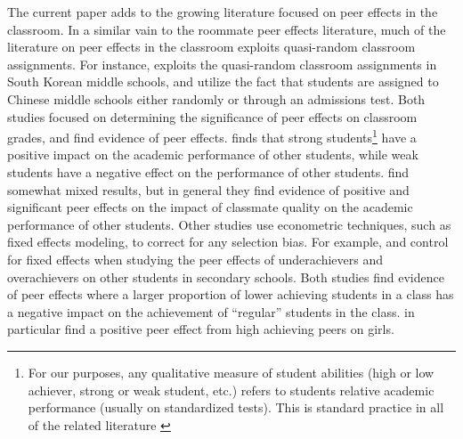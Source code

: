 \documentclass[12pt,letterpaper,english,fleqn]{article}
\begin{document}
The current paper adds to the growing literature focused on peer effects in the classroom.
In a similar vain to the roommate peer effects literature, much of the literature on peer effects in the classroom exploits quasi-random classroom assignments.
For instance, \citet{kang2007classroom} exploits the quasi-random classroom assignments in South Korean middle schools, and \citet{carman2012classroom} utilize the fact that students are assigned to Chinese middle schools either randomly or through an admissions test.
Both studies focused on determining the significance of peer effects on classroom grades, and find evidence of peer effects.
\citet{kang2007classroom} finds that strong students\footnote{For our purposes, any qualitative measure of student abilities (high or low achiever, strong or weak student, etc.) refers to students relative academic performance (usually on standardized tests). This is standard practice in all of the related literature \citep{carman2012classroom,burke2013classroom,kang2007classroom,schlosser2008inside,lavy2012good}} have a positive impact on the academic performance of other students, while weak students have a negative effect on the performance of other students. 
\citet{carman2012classroom} find somewhat mixed results, but in general they find evidence of positive and significant peer effects on the impact of classmate quality on the academic performance of other students.
Other studies use econometric techniques, such as fixed effects modeling, to correct for any selection bias.
For example, \citet{schlosser2008inside} and \citet{lavy2012good} control for fixed effects when studying the peer effects of underachievers and overachievers on other students in secondary schools.
Both studies find evidence of peer effects where a larger proportion of lower achieving students in a class has a negative impact on the achievement of ``regular'' students in the class.
\citet{lavy2012good} in particular find a positive peer effect from high achieving peers on girls.
\end{document}
